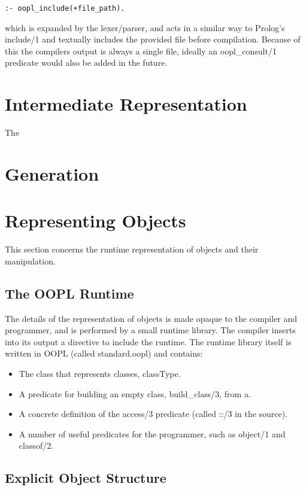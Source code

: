 \documentclass[12pt,a4paper,twoside,openright]{report}
\begin{document}
\begin{verbatim}
:- oopl_include(+file_path).
\end{verbatim}

which is expanded by the lexer/parser, and acts in a similar way to Prolog's include/1 and textually includes the provided file before compilation. Because of this the compilers output is always a single file, ideally an oopl_consult/1 predicate would also be added in the future.

\section{Intermediate Representation}

The

\section{Generation}


\section{Representing Objects}

This section concerns the runtime representation of objects and their manipulation. 

	\subsection{The OOPL Runtime}

The details of the representation of objects is made opaque to the compiler and programmer, and is performed by a small runtime library. The compiler inserts into its output a directive to include the runtime. The runtime library itself is written in OOPL (called standard.oopl) and contains:

\begin{itemize}
	\item The class that represents classes, classType.
	\item A predicate for building an empty class, build_class/3, from a.
	\item A concrete definition of the access/3 predicate (called ::/3 in the source).
	\item A number of useful predicates for the programmer, such as object/1 and classof/2.
\end{itemize}

	\subsection{Explicit Object Structure}
	
\end{document}
